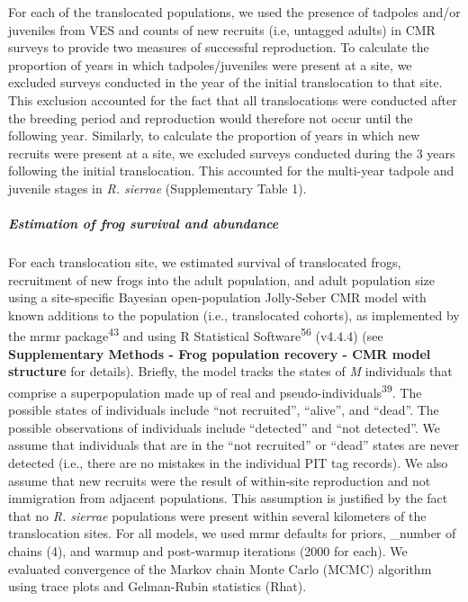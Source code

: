 \documentclass[
  letterpaper,
  DIV=11,
  numbers=noendperiod]{scrartcl}
\let\oldsubparagraph\subparagraph
\renewcommand{\subparagraph}[1]{\oldsubparagraph{#1}\mbox{}}
\begin{document}
For each of the translocated populations, we used the presence of
tadpoles and/or juveniles from VES and counts of new recruits (i.e,
untagged adults) in CMR surveys to provide two measures of successful
reproduction. To calculate the proportion of years in which
tadpoles/juveniles were present at a site, we excluded surveys conducted
in the year of the initial translocation to that site. This exclusion
accounted for the fact that all translocations were conducted after the
breeding period and reproduction would therefore not occur until the
following year. Similarly, to calculate the proportion of years in which
new recruits were present at a site, we excluded surveys conducted
during the 3 years following the initial translocation. This accounted
for the multi-year tadpole and juvenile stages in \emph{R. sierrae}
(Supplementary Table 1).

\subparagraph{Estimation of frog survival and
abundance}\label{estimation-of-frog-survival-and-abundance}

For each translocation site, we estimated survival of translocated
frogs, recruitment of new frogs into the adult population, and adult
population size using a site-specific Bayesian open-population
Jolly-Seber CMR model with known additions to the population (i.e.,
translocated cohorts), as implemented by the mrmr
package\textsuperscript{43} and using R Statistical
Software\textsuperscript{56} (v4.4.4) (see \textbf{Supplementary Methods
- Frog population recovery - CMR model structure} for details). Briefly,
the model tracks the states of \emph{M} individuals that comprise a
superpopulation made up of real and
pseudo-individuals\textsuperscript{39}. The possible states of
individuals include ``not recruited'', ``alive'', and ``dead''. The
possible observations of individuals include ``detected'' and ``not
detected''. We assume that individuals that are in the ``not recruited''
or ``dead'' states are never detected (i.e., there are no mistakes in
the individual PIT tag records). We also assume that new recruits were
the result of within-site reproduction and not immigration from adjacent
populations. This assumption is justified by the fact that no \emph{R.
sierrae} populations were present within several kilometers of the
translocation sites. For all models, we used mrmr defaults for priors,
\_number of chains (4), and warmup and post-warmup iterations (2000 for
each). We evaluated convergence of the Markov chain Monte Carlo (MCMC)
algorithm using trace plots and Gelman-Rubin statistics (Rhat).
\end{document}
